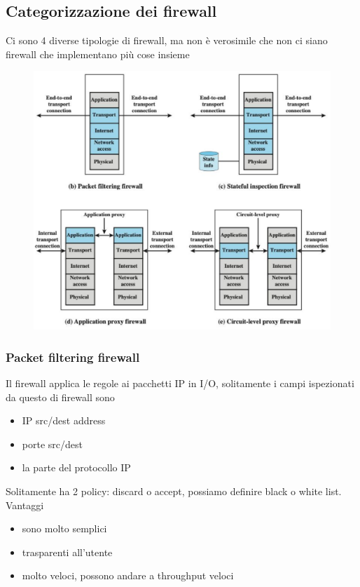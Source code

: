 \documentclass[12pt, oneside]{extbook} %
\begin{document}
\subsection{Categorizzazione dei firewall}
Ci sono 4 diverse tipologie di firewall, ma non è verosimile che non ci siano firewall che implementano più cose insieme\\
\begin{figure}[h!]
    \centering
    \includegraphics[scale=0.5]{../../immagini/firewall_types}
\end{figure}

\subsubsection{Packet filtering firewall}
Il firewall applica le regole ai pacchetti IP in I/O, solitamente i campi ispezionati da questo di firewall sono
\begin{itemize}
\item IP src/dest address
\item porte src/dest
\item la parte del protocollo IP
\end{itemize}
Solitamente ha 2 policy: discard o accept, possiamo definire black o white list.
\\Vantaggi
\begin{itemize}
\item sono molto semplici
\item trasparenti all'utente
\item molto veloci, possono andare a throughput veloci
\end{itemize}
\end{document}
